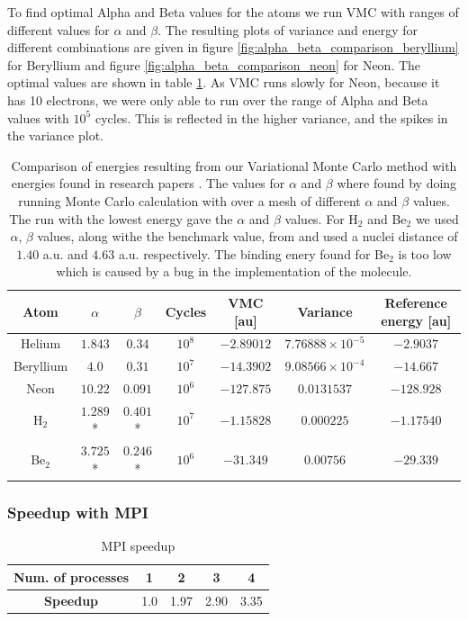 		To find optimal Alpha and Beta values for the atoms we run VMC with ranges of different values for \(\alpha\) and \(\beta\). The resulting plots of variance and energy for different combinations are given in figure \ref{fig:alpha_beta_comparison_beryllium} for Beryllium and figure \ref{fig:alpha_beta_comparison_neon} for Neon. The optimal values are shown in table \ref{tab:EnergyAlphaBetaReference}. As VMC runs slowly for Neon, because it has 10 electrons, we were only able to run over the range of Alpha and Beta values with $10^{5}$ cycles. This is reflected in the higher variance, and the spikes in the variance plot.

		\begin{table}
			\center %
			\begin{tabular}{|c|c|c|c|c|c|c|}
				\hline 
				Atom  & $\alpha$ & $\beta$ & Cycles & VMC {[}au{]} & Variance & Reference energy {[}au{]} \tabularnewline
				\hline 
				Helium & $1.843$ & $0.34$ & $10^{8}$ & $-2.89012$ & $7.76888\times10^{-5}$ & $-2.9037$\tabularnewline
				\hline 
				Beryllium  & $4.0$ & $0.31$ & $10^{7}$ & $-14.3902$  & $9.08566\times10^{-4}$ & $-14.667$ \tabularnewline
				\hline 
				Neon  & $10.22$ & $0.091$ & $10^{6}$ & $-127.875$ & $0.0131537$ & $-128.928$ \tabularnewline
				\hline 
				H$_2$ & $1.289$* & $0.401$* & $10^7$ & $-1.15828$	& $0.000225$  & $-1.17540$ \tabularnewline
				\hline
				Be$_{2}$ & $3.725$* & $0.246$* & $10^6$ & $ -31.349 $	& $ 0.00756 $  & $-29.339$ \tabularnewline
				\hline
			\end{tabular}\protect\caption{Comparison of energies resulting from our Variational Monte Carlo method with
			energies found in research papers \parencite{Koput_2011_PCCP} \parencite{Binkley_1975}. The values for \(\alpha\) and \( \beta \) where found by doing running Monte Carlo calculation with over a mesh of different \(\alpha\) and \( \beta \) values. The run with the lowest energy gave the \(\alpha\) and \(\beta\) values. For H$_2$ and Be$_2$ we used $\alpha$, $\beta$ values, along withe the benchmark value, from \citet{Ihle_Ledum} and used a nuclei distance of \( 1.40 \) a.u. and \( 4.63\) a.u. respectively. The binding enery found for Be\(_2\) is too low which is caused by a bug in the implementation of the molecule.}
			\label{tab:EnergyAlphaBetaReference} 
		\end{table}


	\subsubsection{Speedup with MPI}
		\begin{table}
			\center
			\begin{tabular}{| c | c| c| c| c|}
				\hline
					\textbf{Num. of processes} &	1	&	2	&	3	&	4
				\\ \hline
				\textbf{Speedup}	&	1.0	&	1.97	&	2.90	&	3.35
				\\	\hline
			\end{tabular}
			\caption{MPI speedup}
			\label{tab:MPI_speedup}
		\end{table}

